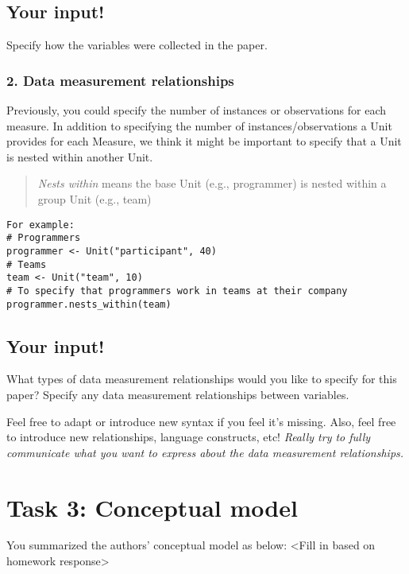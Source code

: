 \subsection*{Your input!}

Specify how the variables were collected in the paper.

\subsubsection{2. Data measurement relationships}

Previously, you could specify the number of instances or observations
for each measure. In addition to specifying the number of
instances/observations a Unit provides for each Measure, we think it
might be important to specify that a Unit is nested within another Unit.

\begin{quote}
\emph{Nests within} means the base Unit (e.g., programmer) is nested
within a group Unit (e.g., team)
\end{quote}

\begin{verbatim}
For example:
# Programmers
programmer <- Unit("participant", 40)
# Teams
team <- Unit("team", 10)
# To specify that programmers work in teams at their company
programmer.nests_within(team)
\end{verbatim}

\hypertarget{your-input-1}{%
\subsection*{Your input!}\label{your-input-1}}

What types of data measurement relationships would you like to specify
for this paper? Specify any data measurement relationships between
variables.

Feel free to adapt or introduce new syntax if you feel it's missing.
Also, feel free to introduce new relationships, language constructs,
etc! \emph{Really try to fully communicate what you want to express
about the data measurement relationships.}

\clearpage


\section{Task 3: Conceptual model}

You summarized the authors' conceptual model as below: <Fill in based on homework response>

